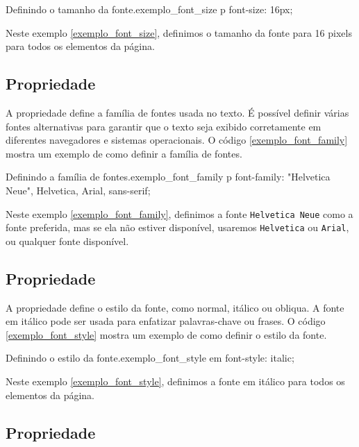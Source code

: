 \begin{csscode}{Definindo o tamanho da fonte.}{exemplo_font_size}
p {
    font-size: 16px;
}
\end{csscode}

Neste exemplo \ref{exemplo_font_size}, definimos o tamanho da fonte para 16 pixels para todos os elementos  da página.

\subsection{Propriedade }

A propriedade  define a família de fontes usada no texto. É possível definir várias fontes alternativas para garantir que o texto seja exibido corretamente em diferentes navegadores e sistemas operacionais. O código \ref{exemplo_font_family} mostra um exemplo de como definir a família de fontes.

\begin{csscode}{Definindo a família de fontes.}{exemplo_font_family}
p {
    font-family: "Helvetica Neue", Helvetica, Arial, sans-serif;
}
\end{csscode}

Neste exemplo \ref{exemplo_font_family}, definimos a fonte \texttt{Helvetica Neue} como a fonte preferida, mas se ela não estiver disponível, usaremos \texttt{Helvetica} ou \texttt{Arial}, ou qualquer fonte  disponível.

\subsection{Propriedade }

A propriedade  define o estilo da fonte, como normal, itálico ou obliqua. A fonte em itálico pode ser usada para enfatizar palavras-chave ou frases. O código \ref{exemplo_font_style} mostra um exemplo de como definir o estilo da fonte.

\begin{csscode}{Definindo o estilo da fonte.}{exemplo_font_style}
em {
    font-style: italic;
}
\end{csscode}

Neste exemplo \ref{exemplo_font_style}, definimos a fonte em itálico para todos os elementos  da página.

\subsection{Propriedade }

